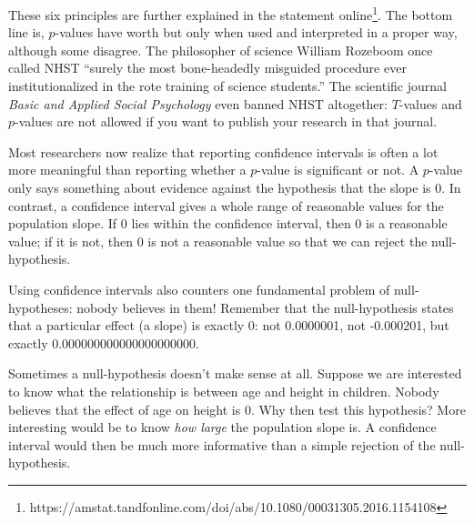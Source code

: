 \documentclass[]{report}\usepackage[]{graphicx}\usepackage[]{color}
\begin{document}
These six principles are further explained in the statement online{\footnote{https://amstat.tandfonline.com/doi/abs/10.1080/00031305.2016.1154108}}. The bottom line is, $p$-values have worth but only when used and interpreted in a proper way, although some disagree. The philosopher of science William Rozeboom once called NHST “surely the most bone-headedly misguided procedure ever institutionalized in the rote training of science students.” The scientific journal \textit{Basic and Applied Social Psychology} even banned NHST altogether: $T$-values and $p$-values are not allowed if you want to publish your research in that journal.

Most researchers now realize that reporting confidence intervals is often a lot more meaningful than reporting whether a $p$-value is significant or not. A $p$-value only says something about evidence against the hypothesis that the slope is 0. In contrast, a confidence interval gives a whole range of reasonable values for the population slope. If 0 lies within the confidence interval, then 0 is a reasonable value; if it is not, then 0 is not a reasonable value so that we can reject the null-hypothesis.

Using confidence intervals also counters one fundamental problem of null-hypotheses: nobody believes in them! Remember that the null-hypothesis states that a particular effect (a slope) is exactly 0: not 0.0000001, not -0.000201, but exactly 0.000000000000000000000.

Sometimes a null-hypothesis doesn't make sense at all. Suppose we are interested to know what the relationship is between age and height in children. Nobody believes that the effect of age on height is 0. Why then test this hypothesis? More interesting would be to know \textit{how large} the population slope is. A confidence interval would then be much more informative than a simple rejection of the null-hypothesis.
\end{document}
